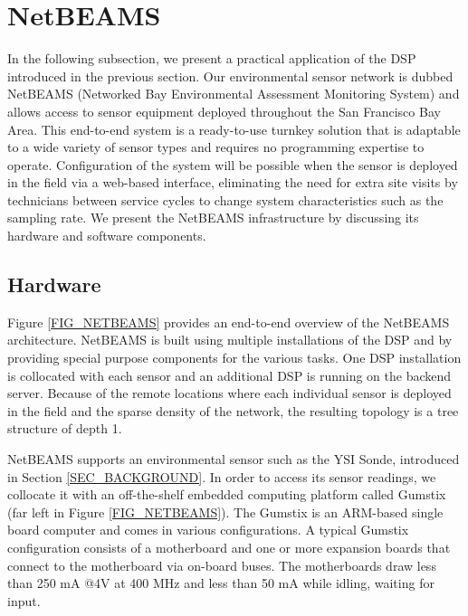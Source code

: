 \documentclass[conference]{IEEEtran}
\begin{document}
\section{NetBEAMS}
\label{SEC_NETBEAMS}

\begin{figure*} 
\centering
{}
\caption{\label{FIG_NETBEAMS} NetBEAMS architecture.}
\end{figure*}

In the following subsection, we present a practical application of the DSP
introduced in the previous section. Our environmental sensor network
is dubbed NetBEAMS (Networked Bay Environmental Assessment Monitoring
System) and allows access to sensor equipment deployed throughout the
San Francisco Bay Area. This end-to-end system is a ready-to-use
turnkey solution that is adaptable to a wide variety of sensor types
and requires no programming expertise to operate. Configuration of the
system will be possible when the sensor is deployed in the field via a
web-based interface, eliminating the need for extra site visits by
technicians between service cycles to change system characteristics
such as the sampling rate.  We present the NetBEAMS infrastructure by
discussing its hardware and software components.


\subsection{Hardware}

Figure \ref{FIG_NETBEAMS} provides an end-to-end overview of the
NetBEAMS architecture. NetBEAMS is built using multiple installations
of the DSP and by providing special purpose components for the various
tasks. One DSP installation is collocated with each sensor and an
additional DSP is running on the backend server. Because of the remote
locations where each individual sensor is deployed in the field and
the sparse density of the network, the resulting topology is a tree
structure of depth 1.

NetBEAMS supports an environmental sensor such as the YSI Sonde,
introduced in Section \ref{SEC_BACKGROUND}. In order to access its
sensor readings, we collocate it with an off-the-shelf embedded
computing platform called Gumstix \cite{gumstix01} (far left in Figure
\ref{FIG_NETBEAMS}).  The Gumstix is an ARM-based single board computer and comes in
various configurations.  A typical Gumstix configuration
consists of a motherboard and one or more expansion boards that
connect to the motherboard via on-board buses.  The motherboards draw
less than 250 mA @4V at 400 MHz and less than 50 mA while idling,
waiting for input.
\end{document}
